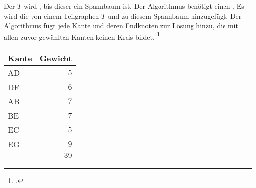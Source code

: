 \documentclass{lehramt-informatik-haupt}
\begin{document}
Der  $T$ wird , bis
dieser ein Spannbaum ist. Der Algorithmus benötigt einen
. Es wird die  von
einem Teilgraphen $T$  und zu diesem
Spannbaum hinzugefügt. Der Algorithmus fügt jede Kante und deren
Endknoten zur Lösung hinzu, die mit allen zuvor gewählten Kanten keinen
Kreis bildet.
\footcite[Seite 32, (PDF 26)]{aud:fs:6}

\begin{minipage}{7cm}
\end{minipage}
\begin{minipage}{4cm}
\begin{center}
\begin{tabular}{|l|r|}
\hline
Kante & Gewicht\\\hline\hline
AD & $5$\\
DF & $6$\\
AB & $7$\\
BE & $7$\\
EC & $5$\\
EG & $9$\\\hline
   & $39$\\\hline
\end{tabular}
\end{center}
\end{minipage}

\literatur
\end{document}
